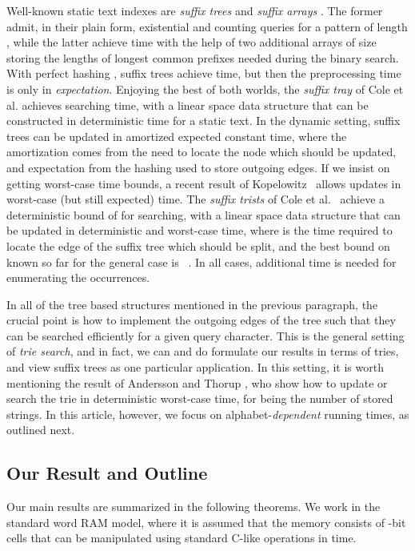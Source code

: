 \documentclass[11pt,onecolumn,final]{article} \usepackage{a4}
\theoremstyle{plain}
\theoremstyle{remark}
\begin{document}
Well-known static text indexes are \emph{suffix trees} \cite{mccreight76space} and \emph{suffix arrays} \cite{manber93suffix}. The former admit, in their plain form,  existential and counting queries for a pattern of length , while the latter achieve  time with the help of two additional arrays of size  storing the lengths of longest common prefixes needed during the binary search. With perfect hashing \cite{fredman84storing}, suffix trees achieve  time, but then the  preprocessing time is only in \emph{expectation}. Enjoying the best of both worlds, the \emph{suffix tray} of Cole et al. \cite{cole06suffix} achieves  searching time, with a linear space data structure that can be constructed in  deterministic time for a static text. In the dynamic setting, suffix trees can be updated in amortized expected constant time, where the amortization comes from the need to locate the node which should be updated, and expectation from the hashing used to store outgoing edges. If we insist on getting worst-case time bounds, a recent result of Kopelowitz~\cite{Kopelot12indexing} allows updates in  worst-case (but still expected) time. The \emph{suffix trists} of Cole et al.~\cite{cole06suffix} achieve a deterministic bound 
of  for searching, with a linear space data structure that can be updated in  deterministic and worst-case time, where  is the time required to locate the edge of the suffix tree which should be split, and the best bound on  known so far for the general case is ~\cite{Amir05towards}. In all cases,  additional time is needed for enumerating the  occurrences.

In all of the tree based structures mentioned in the previous paragraph, the crucial point is how to implement the outgoing edges of the tree such that they can be searched efficiently for a given query character. This is the general setting of \emph{trie search}, and in fact, we can and do formulate our results in terms of tries, and view suffix trees as one particular application. In this setting, it is worth mentioning the result of Andersson and Thorup \cite{andersson07dynamic}, who show how to update or search the trie in  deterministic worst-case time, for  being the number of stored strings. In this article, however, we focus on alphabet-\emph{dependent} running times, as outlined next.

\subsection{Our Result and Outline}
Our main results are summarized in the following theorems. We work in the standard word RAM model, where it is assumed that the memory consists of -bit cells that can be manipulated using standard C-like operations in  time.
\end{document}
